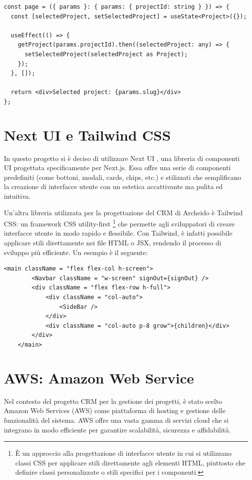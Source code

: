 \documentclass[target=bach,aauheader=,style=]{thud}
\begin{document}
\begin{lstlisting}[caption=Routing dinamico con Next.js]
const page = ({ params }: { params: { projectId: string } }) => {
  const [selectedProject, setSelectedProject] = useState<Project>({});
  
  useEffect(() => {
    getProject(params.projectId).then((selectedProject: any) => {
      setSelectedProject(selectedProject as Project);
    });
  }, []);

  return <div>Selected project: {params.slug}</div>
};
\end{lstlisting}

\section{Next UI e Tailwind CSS}
In questo progetto si è deciso di utilizzare Next UI \cite{nextui2024}, una libreria di componenti UI progettata specificamente per Next.js. Essa offre una serie di componenti predefiniti (come bottoni, modali, cards, chips, etc.) e stilizzati che semplificano la creazione di interfacce utente con un estetica accattivante ma pulita ed intuitiva. 

\noindent Un'altra libreria utilizzata per la progettazione del CRM di Archeido è Tailwind CSS: un framework CSS utility-first \footnote{È un approccio alla progettazione di interfacce utente in cui si utilizzano classi CSS per applicare stili direttamente agli elementi HTML, piuttosto che definire classi personalizzate o stili specifici per i componenti.} che permette agli sviluppatori di creare interfacce utente in modo rapido e flessibile. Con Tailwind, è infatti possibile applicare stili direttamente nei file HTML o JSX, rendendo il processo di sviluppo più efficiente. Un esempio è il seguente:

\begin{lstlisting}[caption=Parte del file \texttt{app.tsx} del CRM]
    <main className = "flex flex-col h-screen">
        <Navbar className = "w-screen" signOut={signOut} />
        <div className = "flex flex-row h-full">
            <div className = "col-auto">
                <SideBar />
            </div>
            <div className = "col-auto p-8 grow">{children}</div>
        </div>
    </main> 
\end{lstlisting}


\section{AWS: Amazon Web Service}
Nel contesto del progetto CRM per la gestione dei progetti, è stato scelto Amazon Web Services (AWS) come piattaforma di hosting e gestione delle funzionalità del sistema. AWS offre una vasta gamma di servizi cloud che si integrano in modo efficiente per garantire scalabilità, sicurezza e affidabilità.
\end{document}
